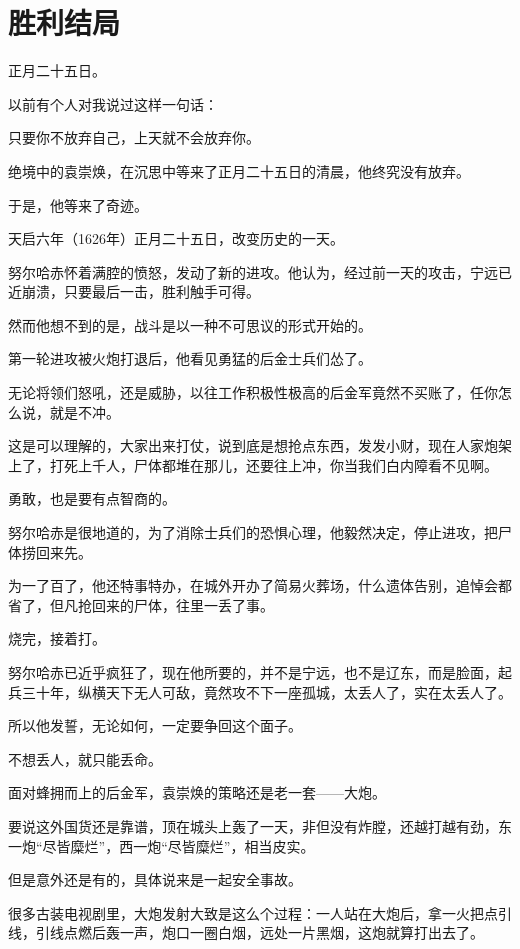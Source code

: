 \section{胜利结局}
\ifnum{}
	\begin{multicols}{\theparacolNo}
		\fi
		正月二十五日。

		以前有个人对我说过这样一句话：

		只要你不放弃自己，上天就不会放弃你。

		绝境中的袁崇焕，在沉思中等来了正月二十五日的清晨，他终究没有放弃。

		于是，他等来了奇迹。

		天启六年（1626年）正月二十五日，改变历史的一天。

		努尔哈赤怀着满腔的愤怒，发动了新的进攻。他认为，经过前一天的攻击，宁远已近崩溃，只要最后一击，胜利触手可得。

		然而他想不到的是，战斗是以一种不可思议的形式开始的。

		第一轮进攻被火炮打退后，他看见勇猛的后金士兵们怂了。

		无论将领们怒吼，还是威胁，以往工作积极性极高的后金军竟然不买账了，任你怎么说，就是不冲。

		这是可以理解的，大家出来打仗，说到底是想抢点东西，发发小财，现在人家炮架上了，打死上千人，尸体都堆在那儿，还要往上冲，你当我们白内障看不见啊。

		勇敢，也是要有点智商的。

		努尔哈赤是很地道的，为了消除士兵们的恐惧心理，他毅然决定，停止进攻，把尸体捞回来先。

		为一了百了，他还特事特办，在城外开办了简易火葬场，什么遗体告别，追悼会都省了，但凡抢回来的尸体，往里一丢了事。

		烧完，接着打。

		努尔哈赤已近乎疯狂了，现在他所要的，并不是宁远，也不是辽东，而是脸面，起兵三十年，纵横天下无人可敌，竟然攻不下一座孤城，太丢人了，实在太丢人了。

		所以他发誓，无论如何，一定要争回这个面子。

		不想丢人，就只能丢命。

		面对蜂拥而上的后金军，袁崇焕的策略还是老一套——大炮。

		要说这外国货还是靠谱，顶在城头上轰了一天，非但没有炸膛，还越打越有劲，东一炮“尽皆糜烂”，西一炮“尽皆糜烂”，相当皮实。

		但是意外还是有的，具体说来是一起安全事故。

		很多古装电视剧里，大炮发射大致是这么个过程：一人站在大炮后，拿一火把点引线，引线点燃后轰一声，炮口一圈白烟，远处一片黑烟，这炮就算打出去了。


\end{multicols}
